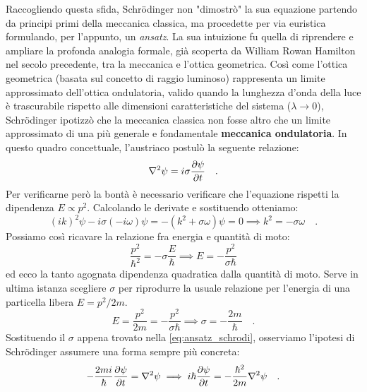 Raccogliendo questa sfida, Schrödinger non "dimostrò" la sua equazione partendo da principi primi della meccanica classica, ma procedette per via euristica formulando, per l'appunto, un \textit{ansatz}. La sua intuizione fu quella di riprendere e ampliare la profonda analogia formale, già scoperta da William Rowan Hamilton nel secolo precedente, tra la meccanica e l'ottica geometrica. Così come l'ottica geometrica (basata sul concetto di raggio luminoso) rappresenta un limite approssimato dell'ottica ondulatoria, valido quando la lunghezza d'onda della luce è trascurabile rispetto alle dimensioni caratteristiche del sistema ($\lambda \to 0$), Schrödinger ipotizzò che la meccanica classica non fosse altro che un limite approssimato di una più generale e fondamentale \textbf{meccanica ondulatoria}. In questo quadro concettuale, l'austriaco postulò la seguente relazione:
\begin{equation}
    \nabla^2\psi = i\sigma\pdv{\psi}{t}  \quad.
    \label{eq:ansatz_schrodi}
\end{equation}
Per verificarne però la bontà è necessario verificare che l'equazione rispetti la dipendenza $E \propto p^2$. Calcolando le derivate e sostituendo otteniamo:
\[
        (ik)^2\psi - i\sigma(-i\omega)\psi = -(k^2 + \sigma\omega)\psi = 0 \implies k^2 = -\sigma \omega \quad. 
\]
Possiamo così ricavare la relazione fra energia e quantità di moto:
\[
    \frac{p^2}{\hbar^2} = - \sigma \frac{E}{\hbar} \implies E = -\frac{p^2}{\sigma \hbar}
\]
ed ecco la tanto agognata dipendenza quadratica dalla quantità di moto. Serve in ultima istanza scegliere $\sigma$ per riprodurre la usuale relazione per l'energia di una particella libera $E = p^2/2m$.
\[
    E = \frac{p^2}{2m} = -\frac{p^2}{\sigma \hbar} \implies \sigma = -\frac{2m}{\hbar}
\quad.
\]
Sostituendo il $\sigma$ appena trovato nella \eqref{eq:ansatz_schrodi}, osserviamo l'ipotesi di Schrödinger assumere una forma sempre più concreta:
\begin{equation}
        -\frac{2mi}{\hbar} \pdv{\psi}{t} = \nabla^2\psi \implies
        {i\hbar \pdv{\psi}{t} = -\frac{\hbar^2}{2m}\nabla^2\psi} \quad.  
    \label{eq:schrodi_cin}
\end{equation}

